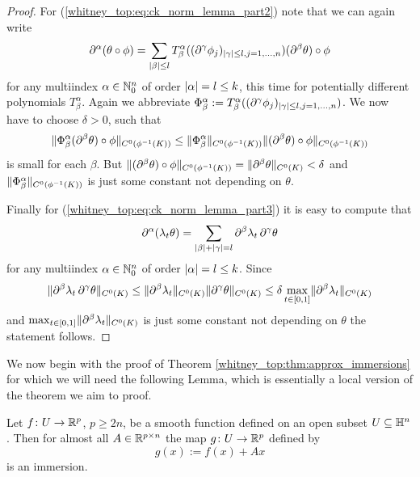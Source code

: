 \begin{proof}
    For (\ref{whitney_top:eq:ck_norm_lemma_part2}) note that we can again write 
    \[
    \partial^\alpha(\theta \circ \phi) = \sum_{\lvert\beta\rvert\leq l} T_\beta^\alpha((\partial^\gamma \phi_j)_{\lvert\gamma\rvert \leq l, j = 1,\ldots,n}) (\partial^\beta \theta) \circ \phi
    \]
    for any multiindex $\alpha \in \mathbb{N}_0^n$ of order $\lvert\alpha\rvert = l \leq k$, this time for potentially different polynomials $T_\beta^\alpha$. Again we abbreviate $\Phi_\beta^\alpha := T_\beta^\alpha((\partial^\gamma \phi_j)_{\lvert\gamma\rvert \leq l, j = 1,\ldots,n})$. We now have to choose $\delta >0$, such that  
    \[
    \lVert\Phi_\beta^\alpha (\partial^\beta \theta) \circ \phi\rVert_{C^0(\phi^{-1}(K))} \leq \lVert\Phi_\beta^\alpha\rVert_{C^0(\phi^{-1}(K))} \lVert(\partial^\beta \theta) \circ \phi\rVert_{C^0(\phi^{-1}(K))}  
    \]
    is small for each $\beta$. But $\lVert(\partial^\beta \theta) \circ \phi\rVert_{C^0(\phi^{-1}(K))} = \lVert\partial^\beta \theta\rVert_{C^0(K)}< \delta$ and $\lVert\Phi_\beta^\alpha\rVert_{C^0(\phi^{-1}(K))}$ is just some constant not depending on $\theta$.

    Finally for  (\ref{whitney_top:eq:ck_norm_lemma_part3}) it is easy to compute that 
    \[
    \partial^\alpha(\lambda_t \theta) = \sum_{\lvert\beta\rvert + \lvert\gamma\rvert = l} \partial^\beta \lambda_t \, \partial^\gamma \theta
    \]
    for any multiindex $\alpha \in \mathbb{N}_0^n$ of order $\lvert\alpha\rvert = l \leq k$. Since 
    \[
    \lVert\partial^\beta \lambda_t \, \partial^\gamma \theta\rVert_{C^0(K)} \leq \lVert\partial^\beta \lambda_t\rVert_{C^0(K)} \lVert\partial^\gamma \theta\rVert_{C^0(K)} \leq \delta \max_{t \in [0,1]} \lVert\partial^\beta \lambda_t\rVert_{C^0(K)}
    \]
    and $\max_{t \in [0,1]} \lVert\partial^\beta \lambda_t\rVert_{C^0(K)}$ is just some constant not depending on $\theta$ the statement follows. 
\end{proof}


We now begin with the proof of Theorem \ref{whitney_top:thm:approx_immersions} for which we will need the following Lemma, which is essentially a local version of the theorem we aim to proof. 

\begin{lemma}
    \label{whitney_top:lem:approx_immersions_lemma}
    Let $f \colon U \to \mathbb{R}^p$, $p \geq 2n$, be a smooth function defined on an open subset $U \subseteq \mathbb{H}^n$. Then for almost all $A \in \mathbb{R}^{p \times n}$ the map $g \colon U \to \mathbb{R}^p$ defined by 
    \[
    g(x) := f(x) + Ax
    \] 
    is an immersion.
\end{lemma}

